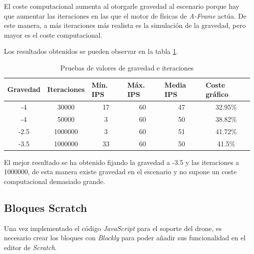 El coste computacional aumenta al otorgarle gravedad al escenario porque hay que aumentar las iteraciones en las que el motor de físicas de \textit{A-Frame} actúa. De este manera, a más iteraciones más realista es la simulación de la gravedad, pero mayor es el coste computacional.

Los resultados obtenidos se pueden observar en la tabla \ref{tab:tablaGravedad}.

\begin{table}[H]
\caption{Pruebas de valores de gravedad e iteraciones}
\centering
\label{tab:tablaGravedad}
\begin{tabular}{|c|c|c|c|c|c|}
\hline
\multicolumn{1}{|l|}{\textbf{Gravedad}} & \multicolumn{1}{l|}{\textbf{Iteraciones}} & \multicolumn{1}{l|}{\textbf{Mín. IPS}} & \multicolumn{1}{l|}{\textbf{Máx. IPS}} & \multicolumn{1}{l|}{\textbf{Media IPS}} & \multicolumn{1}{l|}{\textbf{Coste gráfico}} \\ \hline
-4 & 30000 & 17 & 60 & 47 & 32.95\% \\ \hline
-4 & 50000 & 3 & 60 & 50 & 38.82\% \\ \hline
-2.5 & 1000000 & 3 & 60 & 51 & 41.72\% \\ \hline
-3.5 & 1000000 & 33 & 60 & 50 & 41.5\% \\ \hline
\end{tabular}
\end{table}

El mejor resultado se ha obtenido fijando la gravedad a -3.5 y las iteraciones a 1000000, de esta manera existe gravedad en el escenario y no supone un coste computacional demasiado grande. 

\subsection{Bloques Scratch}

Una vez implementado el código \textit{JavaScript} para el soporte del drone, es necesario crear los bloques con \textit{Blockly} para poder añadir sus funcionalidad en el editor de \textit{Scratch}. 

